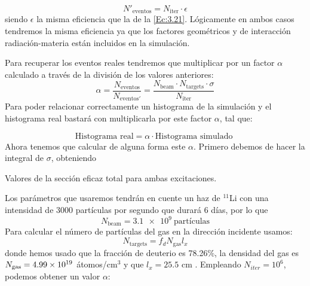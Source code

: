 \begin{equation}
	N'_{\text{eventos}} = N_{\text{iter}} \cdot \epsilon
\end{equation}
siendo $\epsilon$ la misma eficiencia que la de la \cref{Ec:3.21}. Lógicamente en ambos casos tendremos la misma eficiencia ya que los factores geométricos y de interacción radiación-materia están incluidos en la simulación.


Para recuperar los eventos reales tendremos que multiplicar por un factor $\alpha$ calculado a través de la división de los valores anteriores: 
\begin{equation}
	\alpha=\frac{N_{\text{eventos}}}{N_ {\text{eventos}'}} = \frac{N_{\text{beam}} \cdot N_{\text{targets}} \cdot \sigma}{N_{\text{iter}}}
\end{equation}
Para poder relacionar correctamente un histograma de la simulación y el histograma real bastará con multiplicarla por este factor $\alpha$, tal que:

\begin{equation}
	\text{Histograma real} =  \alpha \cdot \text{Histograma simulado }
\end{equation}
Ahora tenemos que calcular de alguna forma este $\alpha$. Primero debemos de hacer la integral de $\sigma$, obteniendo 

\begin{table}[H] \centering
	
	\caption{Valores de la sección eficaz total para ambas excitaciones.}
\end{table}
Los parámetros que  usaremos tendrán en cuente un haz de $^{11}$Li con una intensidad de 3000 partículas por segundo que durará 6 días, por lo que
\begin{equation}
	N_{\text{beam}} = \num{3.1e+9} \ \text{partículas}
\end{equation}
Para calcular el número de partículas del gas en la dirección incidente usamos:
\begin{equation}
	N_{\text{targets}} = f_{d}N_{\text{gas}} l_x
\end{equation}
donde hemos usado que la fracción de deuterio es 78.26\%, la densidad del gas es $N_{\text{gas}}=\num{4.99E+19}$ átomos/cm$^{3}$ y que $l_x=25.5$ cm \cite{ZIEGLER20101818}. Empleando $N_{iter}=10^6$, podemos obtener un valor $\alpha$:
\begin{equation}
	
\end{equation}
